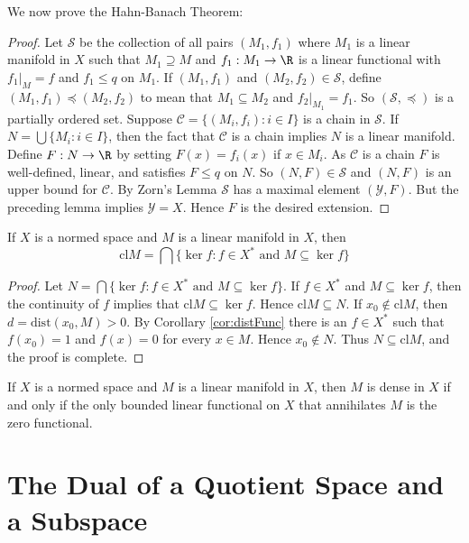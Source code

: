 We now prove the Hahn-Banach Theorem:

\begin{proof}
    Let $\mathscr{S}$ be the collection of all pairs $(M_1,f_1)$ where $M_1$ is a linear manifold in $X$ such that $M_1 \supseteq M$ and $f_1:M_1\rightarrow \R$ is a linear functional with $f_1\vert_M = f$ and $f_1 \leq q$ on $M_1$. If $(M_1,f_1)$ and $(M_2,f_2) \in \mathscr{S}$, define $(M_1,f_1) \preceq (M_2,f_2)$ to mean that $M_1 \subseteq M_2$ and $f_2\vert_M_1 = f_1$. So $(\mathscr{S},\preceq)$ is a partially ordered set. Suppose $\mathscr{C} = \{(M_i,f_i):i \in I\}$ is a chain in $\mathscr{S}$. If $N = \bigcup\{M_i:i \in I\}$, then the fact that $\mathscr{C}$ is a chain implies $N$ is a linear manifold. Define $F:N\rightarrow \R$ by setting $F(x) = f_i(x)$ if $x \in M_i$. As $\mathscr{C}$ is a chain $F$ is well-defined, linear, and satisfies $F\leq q$ on $N$. So $(N,F) \in \mathscr{S}$ and $(N,F)$ is an upper bound for $\mathscr{C}$. By Zorn's Lemma $\mathscr{S}$ has a maximal element $(\mathscr{Y},F)$. But the preceding lemma implies $\mathscr{Y} = X$. Hence $F$ is the desired extension.
\end{proof}


\begin{thm}
    If $X$ is a normed space and $M$ is a linear manifold in $X$, then $$\text{cl}M = \bigcap\{\ker f :f \in X^*\text{ and }M \subseteq \ker f\}$$
\end{thm}
\begin{proof}
    Let $N = \bigcap\{\ker f:f \in X^*\text{ and }M \subseteq \ker f\}$. If $f \in X^*$ and $M \subseteq \ker f$, then the continuity of $f$ implies that $\text{cl}M \subseteq \ker f$. Hence $\text{cl}M \subseteq N$. If $x_0 \notin \text{cl}M$, then $d = \text{dist}(x_0,M) > 0$. By Corollary \ref{cor:distFunc} there is an $f \in X^*$ such that $f(x_0) = 1$ and $f(x) = 0$ for every $x \in M$. Hence $x_0 \notin N$. Thus $N \subseteq \text{cl}M$, and the proof is complete.
\end{proof}

\begin{cor}
    If $X$ is a normed space and $M$ is a linear manifold in $X$, then $M$ is dense in $X$ if and only if the only bounded linear functional on $X$ that annihilates $M$ is the zero functional.
\end{cor}


\section{The Dual of a Quotient Space and a Subspace}
\label{sec:dualQuot}

